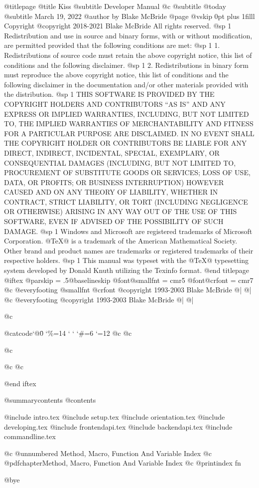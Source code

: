 @titlepage
@title Kiss
@subtitle Developer Manual
@c @subtitle @today{}
@subtitle March 19, 2022
@author by Blake McBride
@page
@vskip 0pt plus 1filll
Copyright  @copyright{} 2018-2021 Blake McBride
All rights reserved.
@sp 1
Redistribution and use in source and binary forms, with or without
modification, are permitted provided that the following conditions are
met:
@sp 1
1. Redistributions of source code must retain the above copyright
notice, this list of conditions and the following disclaimer.
@sp 1
2. Redistributions in binary form must reproduce the above copyright
notice, this list of conditions and the following disclaimer in the
documentation and/or other materials provided with the distribution.
@sp 1
THIS SOFTWARE IS PROVIDED BY THE COPYRIGHT HOLDERS AND CONTRIBUTORS
``AS IS'' AND ANY EXPRESS OR IMPLIED WARRANTIES, INCLUDING, BUT NOT
LIMITED TO, THE IMPLIED WARRANTIES OF MERCHANTABILITY AND FITNESS FOR
A PARTICULAR PURPOSE ARE DISCLAIMED. IN NO EVENT SHALL THE COPYRIGHT
HOLDER OR CONTRIBUTORS BE LIABLE FOR ANY DIRECT, INDIRECT, INCIDENTAL,
SPECIAL, EXEMPLARY, OR CONSEQUENTIAL DAMAGES (INCLUDING, BUT NOT
LIMITED TO, PROCUREMENT OF SUBSTITUTE GOODS OR SERVICES; LOSS OF USE,
DATA, OR PROFITS; OR BUSINESS INTERRUPTION) HOWEVER CAUSED AND ON ANY
THEORY OF LIABILITY, WHETHER IN CONTRACT, STRICT LIABILITY, OR TORT
(INCLUDING NEGLIGENCE OR OTHERWISE) ARISING IN ANY WAY OUT OF THE USE
OF THIS SOFTWARE, EVEN IF ADVISED OF THE POSSIBILITY OF SUCH DAMAGE.
@sp 1
Windows and Microsoft are registered trademarks of
Microsoft Corporation.  @TeX{}@ is a trademark of the American
Mathematical Society. Other brand and product names are trademarks or
registered trademarks of their respective holders.
@sp 1
This manual was typeset with the @TeX{}@ typesetting system developed by
Donald Knuth utilizing the Texinfo format.
@end titlepage
@iftex
@parskip = .5@baselineskip
@font@smallfnt = cmr5
@font@crfont = cmr7
@c @everyfooting {@smallfnt {@crfont @copyright{}} 1993-2003 Blake McBride} @| @|
@c @everyfooting { @copyright{} 1993-2003 Blake McBride} @| @|


@c {@catcode`@\=0 \catcode`\%=14 \catcode` \catcode` \catcode `\#=6 \catcode `\@=12
@c 
@c 
@c 
@c %
@c }

@end iftex

@summarycontents
@contents

@include intro.tex
@include setup.tex
@include orientation.tex
@include developing.tex
@include frontendapi.tex
@include backendapi.tex
@include commandline.tex


@c @unnumbered Method, Macro, Function And Variable Index
@c @pdfchapter{Method, Macro, Function And Variable Index}
@c @printindex fn

@bye

